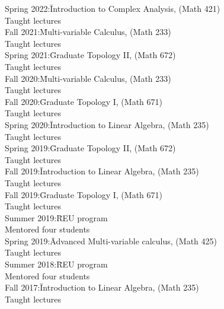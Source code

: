 \documentclass[11pt]{amsart}
\theoremstyle{plain}
\theoremstyle{definition}
\theoremstyle{remark}
\begin{document}
\begin{tabbing}
Spring 2022:\quad\quad\= Introduction to Complex Analysis, (Math 421)\\
\>Taught lectures \\


Fall 2021:\quad\quad\quad\= Multi-variable Calculus, (Math 233)\\
\>Taught lectures \\

  
Spring 2021:\quad\quad\= Graduate Topology II, (Math 672)\\
\>Taught lectures \\

  
Fall 2020:\quad\quad\quad\= Multi-variable Calculus, (Math 233)\\
\>Taught lectures \\

  
Fall 2020:\quad\quad\quad\= Graduate Topology I, (Math 671)\\
\>Taught lectures \\
  
  
Spring 2020:\quad\quad\= Introduction to Linear Algebra, (Math 235)\\
\>Taught lectures \\


  
Spring 2019:\quad\quad\= Graduate Topology II, (Math 672)\\
\>Taught lectures \\

  
Fall 2019:\quad\quad\quad\= Introduction to Linear Algebra, (Math 235)\\
\>Taught lectures \\

  
Fall 2019:\quad\quad\quad\= Graduate Topology I, (Math 671)\\
\>Taught lectures \\


Summer 2019:\quad\= REU program\\
\>Mentored four students \\
  
  
Spring 2019:\quad\quad\= Advanced Multi-variable calculus, (Math 425)\\
\>Taught lectures \\


Summer 2018:\quad\= REU program\\
\>Mentored four students \\

  
Fall 2017:\quad\quad\quad\= Introduction to Linear Algebra, (Math 235)\\
\>Taught lectures \\



\end{tabbing}
\end{document}
